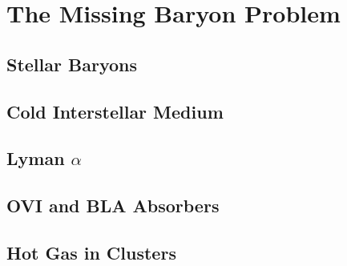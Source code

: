 \chapter{The Missing Baryon Problem}

\section{Stellar Baryons}
\section{Cold Interstellar Medium}
\section{Lyman $\alpha$}
\section{OVI and BLA Absorbers}
\section{Hot Gas in Clusters}


